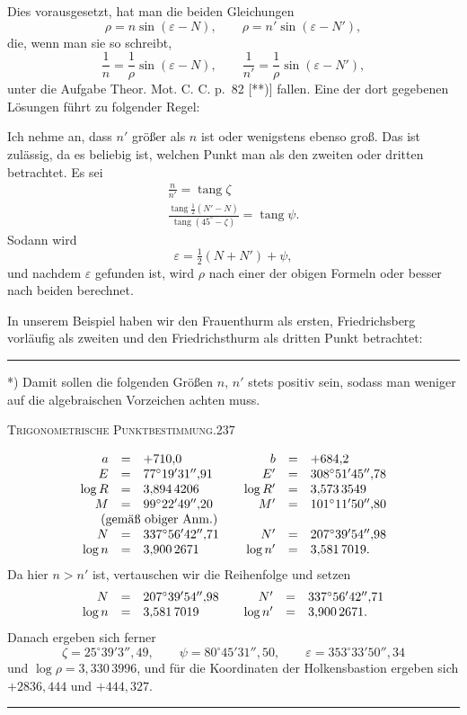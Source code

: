 Dies vorausgesetzt, hat man die beiden Gleichungen
\[
\rho=n\sin(\varepsilon-N),\qquad\rho=n'\sin(\varepsilon-N'),
\]
die, wenn man sie so schreibt,
\[
\frac1n=\frac1\rho\sin(\varepsilon-N),\qquad\frac1{n'}=\frac1\rho\sin(\varepsilon-N'),
\]
unter die Aufgabe Theor. Mot. C. C. p.~82 [**)] fallen. Eine der dort gegebenen Lösungen führt zu folgender Regel:

Ich nehme an, dass $n'$ größer als $n$ ist oder wenigstens ebenso groß. Das ist zulässig, da es beliebig ist, welchen Punkt man als den zweiten oder dritten betrachtet. Es sei
\[
\begin{gathered}
\frac n{n'}=\operatorname{tang}\zeta\\[5pt]
\frac{\operatorname{tang}\frac12(N'-N)}{\operatorname{tang}(45^\circ-\zeta)}=\operatorname{tang}\psi.
\end{gathered}
\]
Sodann wird
\[
\varepsilon=\tfrac12(N+N')+\psi,
\]
und nachdem $\varepsilon$ gefunden ist, wird $\rho$ nach einer der obigen Formeln oder besser nach beiden berechnet.

In unserem Beispiel haben wir den Frauenthurm als ersten, Friedrichsberg vorläufig als zweiten und den Friedrichsthurm als dritten Punkt betrachtet:
\vfill
\noindent\rule{4cm}{.4pt}\par
{\footnotesize
*) Damit sollen die folgenden Größen $n$, $n'$ stets positiv sein, sodass man weniger auf die algebraischen Vorzeichen achten muss.\par
[**) Band VII, Seite 100.]\par}

\clearpage
\noindent\mbox{}\hfill\textsc{Trigonometrische Punktbestimmung.}\hfill237\par\medskip
\[
\begin{array}{rcl@{\qquad}rcl}
a&=&+710{,}0&b&=&+684{,}2\\
E&=&77^\circ19'31''{,}91&E'&=&308^\circ51'45''{,}78\\
\log R&=&3{,}894\,4206&\log R'&=&3{,}573\,3549\\
M&=&99^\circ22'49''{,}20&M'&=&101^\circ11'50''{,}80\\
\multicolumn{3}{c}{\text{(gemäß obiger Anm.)}}&&&\\
N&=&337^\circ56'42''{,}71&N'&=&207^\circ39'54''{,}98\\
\log n&=&3{,}900\,2671&\log n'&=&3{,}581\,7019.
\end{array}
\]
Da hier $n>n'$ ist, vertauschen wir die Reihenfolge und setzen
\[
\begin{array}{rcl@{\qquad}rcl}
N&=&207^\circ39'54''{,}98&N'&=&337^\circ56'42''{,}71\\
\log n&=&3{,}581\,7019&\log n'&=&3{,}900\,2671.
\end{array}
\]
Danach ergeben sich ferner
\[
\zeta=25^\circ39'3''{,}49,\qquad
\psi=80^\circ45'31''{,}50,\qquad
\varepsilon=353^\circ33'50''{,}34
\]
und $\log\rho=3{,}330\,3996$, und für die Koordinaten der Holkensbastion ergeben sich $+2836{,}444$ und $+444{,}327$.
\vspace{1cm}
\begin{center}\rule{4cm}{.4pt}\end{center}

